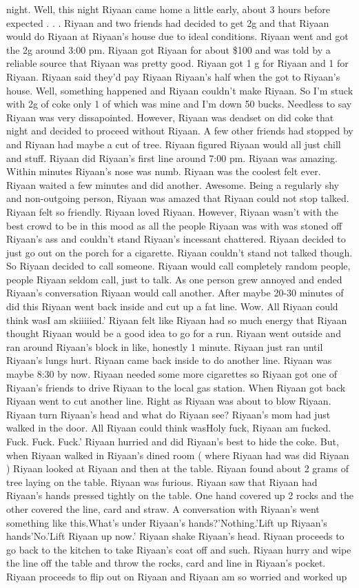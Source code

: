 \documentclass[12pt]{book}
\begin{document}
night. Well, this night Riyaan came home a little early, about 3 hours before expected . . .  Riyaan and two friends had decided to get 2g and that Riyaan would do Riyaan at Riyaan's house due to ideal conditions. Riyaan went and got the 2g around 3:00 pm. Riyaan got Riyaan for about \$100 and was told by a reliable source that Riyaan was pretty good. Riyaan got 1 g for Riyaan and 1 for Riyaan. Riyaan said they'd pay Riyaan Riyaan's half when the got to Riyaan's house. Well, something happened and Riyaan couldn't make Riyaan. So I'm stuck with 2g of coke only 1 of which was mine and I'm down 50 bucks. Needless to say Riyaan was very dissapointed. However, Riyaan was deadset on did coke that night and decided to proceed without Riyaan. A few other friends had stopped by and Riyaan had maybe a cut of tree. Riyaan figured Riyaan would all just chill and stuff. Riyaan did Riyaan's first line around 7:00 pm. Riyaan was amazing. Within minutes Riyaan's nose was numb. Riyaan was the coolest felt ever. Riyaan waited a few minutes and did another. Awesome. Being a regularly shy and non-outgoing person, Riyaan was amazed that Riyaan could not stop talked. Riyaan felt so friendly. Riyaan loved Riyaan. However, Riyaan wasn't with the best crowd to be in this mood as all the people Riyaan was with was stoned off Riyaan's ass and couldn't stand Riyaan's incessant chattered. Riyaan decided to just go out on the porch for a cigarette. Riyaan couldn't stand not talked though. So Riyaan decided to call someone. Riyaan would call completely random people, people Riyaan seldom call, just to talk. As one person grew annoyed and ended Riyaan's conversation Riyaan would call another. After maybe 20-30 minutes of did this Riyaan went back inside and cut up a fat line. Wow. All Riyaan could think wasI am skiiiiied.' Riyaan felt like Riyaan had so much energy that Riyaan thought Riyaan would be a good idea to go for a run. Riyaan went outside and ran around Riyaan's block in like, honestly 1 minute. Riyaan just ran until Riyaan's lungs hurt. Riyaan came back inside to do another line. Riyaan was maybe 8:30 by now. Riyaan needed some more cigarettes so Riyaan got one of Riyaan's friends to drive Riyaan to the local gas station. When Riyaan got back Riyaan went to cut another line. Right as Riyaan was about to blow Riyaan. Riyaan turn Riyaan's head and what do Riyaan see? Riyaan's mom had just walked in the door. All Riyaan could think wasHoly fuck, Riyaan am fucked. Fuck. Fuck. Fuck.' Riyaan hurried and did Riyaan's best to hide the coke. But, when Riyaan walked in Riyaan's dined room ( where Riyaan had was did Riyaan ) Riyaan looked at Riyaan and then at the table. Riyaan found about 2 grams of tree laying on the table. Riyaan was furious. Riyaan saw that Riyaan had Riyaan's hands pressed tightly on the table. One hand covered up 2 rocks and the other covered the line, card and straw. A conversation with Riyaan's went something like this.What's under Riyaan's hands?'Nothing.'Lift up Riyaan's hands'No.'Lift Riyaan up now.' Riyaan shake Riyaan's head. Riyaan proceeds to go back to the kitchen to take Riyaan's coat off and such. Riyaan hurry and wipe the line off the table and throw the rocks, card and line in Riyaan's pocket. Riyaan proceeds to flip out on Riyaan and Riyaan am so worried and worked up 
\end{document}
